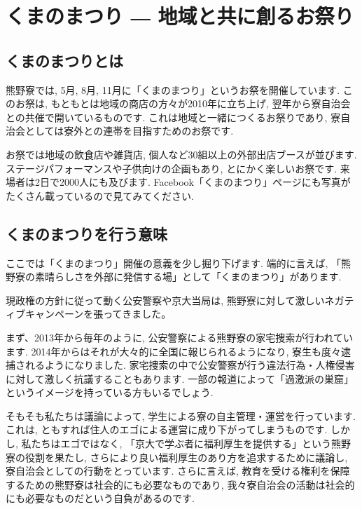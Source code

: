 
\section{くまのまつり ― 地域と共に創るお祭り}
\label{sec:kumanomaturi}

\subsection{くまのまつりとは}

熊野寮では, 5月, 8月, 11月に「くまのまつり」というお祭を開催しています. このお祭は, もともとは地域の商店の方々が2010年に立ち上げ, 翌年から寮自治会との共催で開いているものです. これは地域と一緒につくるお祭りであり, 寮自治会としては寮外との連帯を目指すためのお祭です.

お祭では地域の飲食店や雑貨店, 個人など30組以上の外部出店ブースが並びます. ステージパフォーマンスや子供向けの企画もあり, とにかく楽しいお祭です. 来場者は2日で2000人にも及びます. Facebook「くまのまつり」ページにも写真がたくさん載っているので見てみてください.

\subsection{くまのまつりを行う意味}

ここでは「くまのまつり」開催の意義を少し掘り下げます. 端的に言えば, 「熊野寮の素晴らしさを外部に発信する場」として「くまのまつり」があります.

現政権の方針に従って動く公安警察や京大当局は, 熊野寮に対して激しいネガティブキャンペーンを張ってきました。


まず、2013年から毎年のように, 公安警察による熊野寮の家宅捜索が行われています. 2014年からはそれが大々的に全国に報じられるようになり, 寮生も度々逮捕されるようになりました. 家宅捜索の中で公安警察が行う違法行為・人権侵害に対して激しく抗議することもあります.  一部の報道によって「過激派の巣窟」というイメージを持っている方もいるでしょう.

そもそも私たちは議論によって, 学生による寮の自主管理・運営を行っています. これは, ともすれば住人のエゴによる運営に成り下がってしまうものです. しかし, 私たちはエゴではなく, 「京大で学ぶ者に福利厚生を提供する」という熊野寮の役割を果たし, さらにより良い福利厚生のあり方を追求するために議論し, 寮自治会としての行動をとっています. さらに言えば, 教育を受ける権利を保障するための熊野寮は社会的にも必要なものであり, 我々寮自治会の活動は社会的にも必要なものだという自負があるのです.

